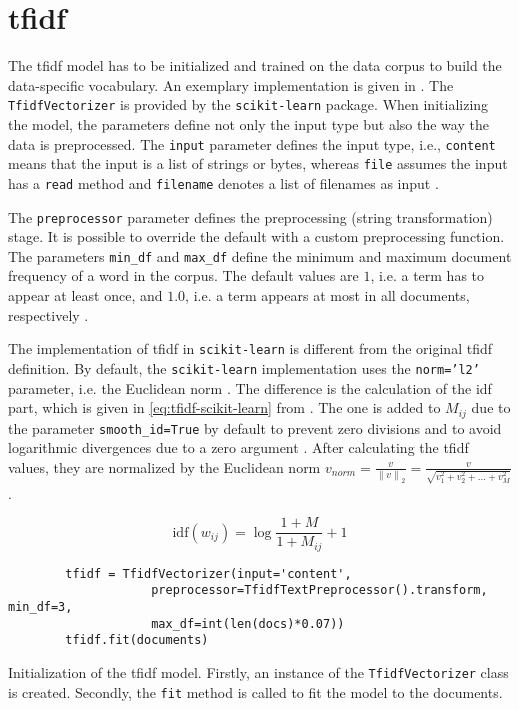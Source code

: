 \section{\ac{tfidf}}\label{sec:impl-tfidf}

The \ac{tfidf} model has to be initialized and trained on the data corpus to build the data-specific vocabulary.
An exemplary implementation is given in .
The \texttt{TfidfVectorizer} is provided by the \texttt{scikit-learn} package.
When initializing the model, the parameters define not only the input type but also the way the data is preprocessed.
The \texttt{input} parameter defines the input type, i.e., \texttt{content} means that the input is a list of strings or bytes, 
whereas \texttt{file} assumes the input has a \texttt{read} method and \texttt{filename} denotes a list of filenames as input \cite{tfidf-vec-scikit-learn}.

The \texttt{preprocessor} parameter defines the preprocessing (string transformation) stage.
It is possible to override the default with a custom preprocessing function.
The parameters \texttt{min\_df} and \texttt{max\_df} define the minimum and maximum document frequency of a word in the corpus.
The default values are $1$, i.e. a term has to appear at least once, and $1.0$, i.e. a term appears at most in all documents, respectively \cite{tfidf-vec-scikit-learn}.

The implementation of \ac{tfidf} in \texttt{scikit-learn} is different from the original \ac{tfidf} definition.
By default, the \texttt{scikit-learn} implementation uses the \texttt{norm='l2'} parameter, i.e. the Euclidean norm \cite{tfidf-scikit-learn}.
The difference is the calculation of the \ac{idf} part, which is given in \autoref{eq:tfidf-scikit-learn} from \cite{tfidf-scikit-learn}.
The one is added to $M_{ij}$ due to the parameter \texttt{smooth\_id=True} by default to prevent zero divisions \cite{tfidf-scikit-learn}
and to avoid logarithmic divergences due to a zero argument \cite{glove2014}.
After calculating the \ac{tfidf} values, they are normalized by the Euclidean norm 
$v_{norm} = \frac{v}{\left\| v \right\|_{2}} = \frac{v}{\sqrt{v_1^{2} + v_2^{2} + ... + v_M^{2}}}$.

\begin{equation}
    \text{idf}(w_{ij}) = \log \frac{1 + M}{1 + M_{ij}} + 1    
    \label{eq:tfidf-scikit-learn}
\end{equation}

\begin{listing}[htp]
    \begin{verbatim}
        tfidf = TfidfVectorizer(input='content', 
                    preprocessor=TfidfTextPreprocessor().transform, min_df=3, 
                    max_df=int(len(docs)*0.07))
        tfidf.fit(documents)
    \end{verbatim}
    \caption{Initialization of the \ac{tfidf} model.
    Firstly, an instance of the \texttt{TfidfVectorizer} class is created.
    Secondly, the \texttt{fit} method is called to fit the model to the documents.
    }
    \label{lst:impl-tfidf}
\end{listing}

